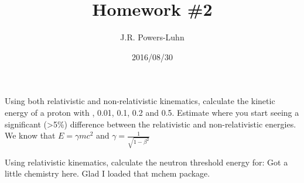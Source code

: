 \documentclass{hw}
\author{J.R. Powers-Luhn}
\date{2016/08/30}
\title{Homework \#2}
\begin{document}
	Using both relativistic and non-relativistic kinematics, calculate the kinetic energy of a proton with , 0.01, 0.1, 0.2 and 0.5. Estimate where you start seeing a significant (>5\%) difference between the relativistic and non-relativistic energies.
\solution
	We know that $ E=\gamma m c^2 $ and $ \gamma = \frac{1}{\sqrt{1-\beta^2}} $

	Using relativistic kinematics, calculate the neutron threshold energy for: 
\solution
	Got a little chemistry here. Glad I loaded that mchem package.
\end{document}
